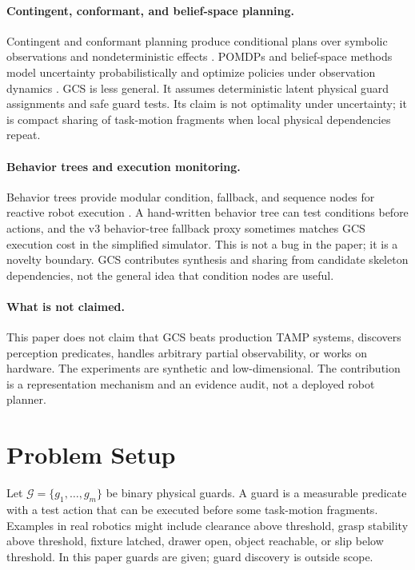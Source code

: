 \documentclass{article}
\newcommand{\guards}{\mathcal{G}}
\begin{document}
\paragraph{Contingent, conformant, and belief-space planning.}
Contingent and conformant planning produce conditional plans over symbolic observations and nondeterministic effects \citep{cimatti2003conformant,hoffmann2005contingent,bonet2000planning}. POMDPs and belief-space methods model uncertainty probabilistically and optimize policies under observation dynamics \citep{kaelbling1998planning,kaelbling2013belief}. GCS is less general. It assumes deterministic latent physical guard assignments and safe guard tests. Its claim is not optimality under uncertainty; it is compact sharing of task-motion fragments when local physical dependencies repeat.

\paragraph{Behavior trees and execution monitoring.}
Behavior trees provide modular condition, fallback, and sequence nodes for reactive robot execution \citep{colledanchise2018behavior,iovino2022survey}. A hand-written behavior tree can test conditions before actions, and the v3 behavior-tree fallback proxy sometimes matches GCS execution cost in the simplified simulator. This is not a bug in the paper; it is a novelty boundary. GCS contributes synthesis and sharing from candidate skeleton dependencies, not the general idea that condition nodes are useful.

\paragraph{What is not claimed.}
This paper does not claim that GCS beats production TAMP systems, discovers perception predicates, handles arbitrary partial observability, or works on hardware. The experiments are synthetic and low-dimensional. The contribution is a representation mechanism and an evidence audit, not a deployed robot planner.

\section{Problem Setup}
Let $\guards=\{g_1,\ldots,g_m\}$ be binary physical guards. A guard is a measurable predicate with a test action that can be executed before some task-motion fragments. Examples in real robotics might include clearance above threshold, grasp stability above threshold, fixture latched, drawer open, object reachable, or slip below threshold. In this paper guards are given; guard discovery is outside scope.
\end{document}
